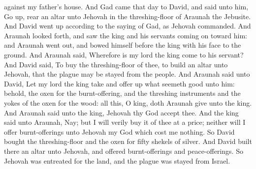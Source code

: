 against my father’s house.  And Gad came that day to David, and said unto him, Go up, rear an altar unto Jehovah in the threshing-floor of Araunah the Jebusite. And David went up according to the saying of Gad, as Jehovah commanded. And Araunah looked forth, and saw the king and his servants coming on toward him: and Araunah went out, and bowed himself before the king with his face to the ground. And Araunah said, Wherefore is my lord the king come to his servant? And David said, To buy the threshing-floor of thee, to build an altar unto Jehovah, that the plague may be stayed from the people. And Araunah said unto David, Let my lord the king take and offer up what seemeth good unto him: behold, the oxen for the burnt-offering, and the threshing instruments and the yokes of the oxen for the wood: all this, O king, doth Araunah give unto the king. And Araunah said unto the king, Jehovah thy God accept thee. And the king said unto Araunah, Nay; but I will verily buy it of thee at a price; neither will I offer burnt-offerings unto Jehovah my God which cost me nothing. So David bought the threshing-floor and the oxen for fifty shekels of silver. And David built there an altar unto Jehovah, and offered burnt-offerings and peace-offerings. So Jehovah was entreated for the land, and the plague was stayed from Israel. 